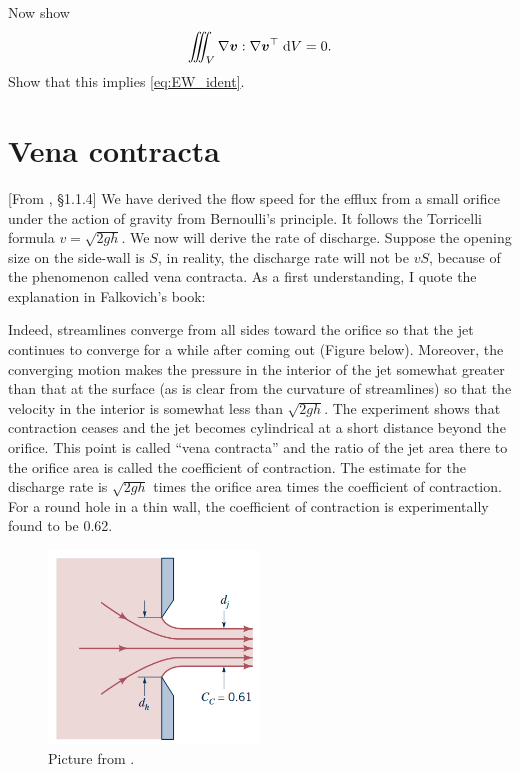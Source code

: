 \documentclass[11pt,letterpaper]{article}
\begin{document}
\subsection{}
Now show
\begin{align}
    \iiint_V \nabla \boldsymbol{v}:\nabla\boldsymbol{v}^\top \;\mathrm{d} V = 0.
\end{align}
Show that this implies \eqref{eq:EW_ident}.

\newpage
\section{Vena contracta}
[From \cite{Falkovich_18}, \S 1.1.4] We have derived the flow speed for the efflux from a small orifice under the action of gravity from Bernoulli's principle. It follows the Torricelli formula $v = \sqrt{2gh}$. We now will derive the rate of discharge. Suppose the opening size on the side-wall is $S$, in reality, the discharge rate will not be $vS$, because of the phenomenon called vena contracta. As a first understanding, I quote the explanation in Falkovich's book:
\begin{displayquote}
    Indeed, streamlines converge from all sides toward the orifice so that the jet continues to converge for a while after coming out (Figure below). Moreover, the converging motion makes the pressure in the interior of the jet somewhat greater than that at the surface (as is clear from the curvature of streamlines) so that the velocity in the interior is somewhat less than $\sqrt{2gh}$. The experiment shows that contraction ceases and the jet becomes cylindrical at a short distance beyond the orifice. This point is called ``vena contracta'' and the ratio of the jet area there to the orifice area is called the coefficient of contraction. The estimate for the discharge rate is $\sqrt{2gh}$ times the orifice area times the coefficient of contraction. For a round hole in a thin wall, the coefficient of contraction is experimentally found to be 0.62.
\end{displayquote}
\begin{figure}[H]
    \centering
    \includegraphics[width=0.5\textwidth]{figs/vena_contracta}
    \caption{Picture from \cite{GerhartEtAl_20}.}
\end{figure}
\end{document}
